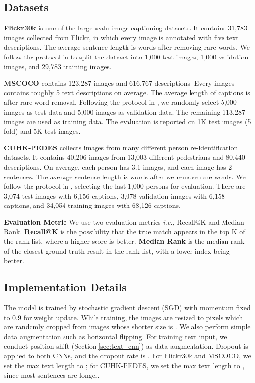 \documentclass[10pt,final,journal]{IEEEtran}
\newcommand{\ie}{\mbox{\emph{i.e.}}}
\begin{document}
\subsection{Datasets} \label{sec:dataset}
\textbf{Flickr30k} \cite{young2014image} is one of the large-scale image captioning datasets. It contains 31,783 images collected from Flickr, in which every image is annotated with five text descriptions. The average sentence length is  words after removing rare words. We follow the protocol in \cite{hodosh2013framing,karpathy2014deep} to split the dataset into 1,000 test images, 1,000 validation images, and 29,783 training images.


\textbf{MSCOCO} \cite{lin2014microsoft} contains 123,287 images and 616,767 descriptions. Every images contains roughly 5 text descriptions on average. The average length of captions is  after rare word removal.  
Following the protocol in \cite{karpathy2015deep}, we randomly select 5,000 images as test data and 5,000 images as validation data. The remaining 113,287 images are used as training data. The evaluation is reported on 1K test images (5 fold) and 5K test images. 



\textbf{CUHK-PEDES} \cite{li2017person} collects images from many different person re-identification datasets. It contains 40,206 images from 13,003 different pedestrians and 80,440 descriptions. On average, each person has 3.1 images, and each image has 2 sentences. The average sentence length is  words after we remove  rare words.  
We follow the protocol in \cite{li2017person}, selecting the last 1,000 persons for evaluation. There are 3,074 test images with 6,156 captions, 3,078 validation images with 6,158 captions, and 34,054 training images with 68,126 captions. 

\textbf{Evaluation Metric} We use two evaluation metrics \ie, Recall@K and Median Rank. \textbf{Recall@K} is the possibility that the true match appears in the top K of the rank list, where a higher score is better. \textbf{Median Rank} is the median rank of the closest ground truth result in the rank list, with a lower index being better. 


\subsection{Implementation Details} \label{sec:details}
The model is trained by stochastic gradient descent (SGD) with momentum fixed to 0.9 for weight update. While training, the images are resized to  pixels which are randomly cropped from images whose shorter size is . 
We also perform simple data augmentation such as horizontal flipping.  For training text input, we conduct position shift (Section \ref{sec:text_cnn}) as data augmentation. Dropout is applied to both CNNs, and the dropout rate is . For Flickr30k and MSCOCO, we set the max text length to ; for CUHK-PEDES, we set the max text length to , since most sentences are longer. 
\end{document}
